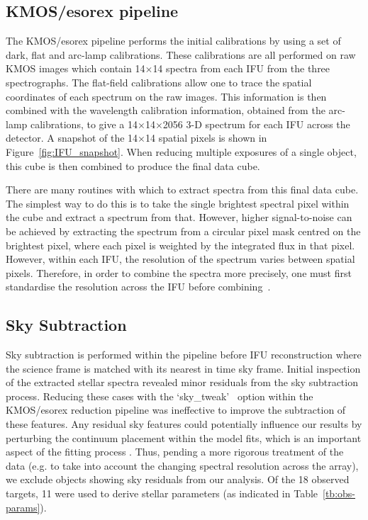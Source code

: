 \subsection{KMOS/esorex pipeline} %
\label{sub:kmos_esorex_pipeline}

The KMOS/esorex pipeline performs the initial calibrations by using a set of dark, flat and arc-lamp calibrations.
These calibrations are all performed on raw KMOS images which contain 14$\times$14 spectra from each IFU from the three spectrographs.
The flat-field calibrations allow one to trace the spatial coordinates of each spectrum on the raw images.
This information is then combined with the wavelength calibration information,
obtained from the arc-lamp calibrations, to give a 14$\times$14$\times$2056 3-D spectrum for each IFU across the detector.
A snapshot of the 14$\times$14 spatial pixels is shown in Figure~\ref{fig:IFU_snapshot}.
When reducing multiple exposures of a single object, this cube is then combined to produce the final data cube.

There are many routines with which to extract spectra from this final data cube.
The simplest way to do this is to take the single brightest spectral pixel within the cube and extract a spectrum from that.
However, higher signal-to-noise can be achieved by extracting the spectrum from a circular pixel mask centred on the brightest pixel, where each pixel is weighted by the integrated flux in that pixel.
However, within each IFU, the resolution of the spectrum varies between spatial pixels.
Therefore, in order to combine the spectra more precisely, one must first standardise the resolution across the IFU before combining~\citep{2015ApJ...805..182G}.


\subsection{Sky Subtraction} %
\label{sub:sky_subtraction}

Sky subtraction is performed within the pipeline before IFU reconstruction where the science frame is matched with its nearest in time sky frame.
Initial inspection of the extracted stellar spectra revealed minor residuals from the sky subtraction process.
Reducing these cases with the \textquoteleft sky\_tweak\textquoteright
~option within the KMOS/esorex reduction pipeline was ineffective to improve the subtraction of these features.
Any residual sky features could potentially influence our results by perturbing the continuum placement within the model fits, which is an important aspect of the fitting process
\citep[see][for more discussion]{2014ApJ...788...58G,2015ApJ...806...21D}.
Thus, pending a more rigorous treatment of the data
(e.g. to take into account the changing spectral resolution across the array),
we exclude objects showing sky residuals from our analysis.
Of the 18 observed targets, 11 were used to derive stellar parameters
(as indicated in Table~\ref{tb:obs-params}).


